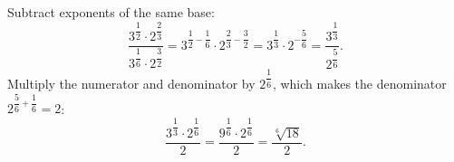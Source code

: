 Subtract exponents of the same base:
\[\dfrac{3^{\dfrac{1}{2}}\cdot2^{\dfrac{2}{3}}}{3^{\dfrac{1}{6}}\cdot2^{\dfrac{3}{2}}}=3^{\dfrac{1}{2}-\dfrac{1}{6}}\cdot2^{\dfrac{2}{3}-\dfrac{3}{2}}=3^{\dfrac{1}{3}}\cdot2^{-\dfrac{5}{6}}=\dfrac{3^{\dfrac{1}{3}}}{2^{\dfrac{5}{6}}}.\]
Multiply the numerator and denominator by $2^{\dfrac{1}{6}}$, which makes the denominator $2^{\dfrac{5}{6}+\dfrac{1}{6}}=2$:
\[\dfrac{3^{\dfrac{1}{3}}\cdot2^{\dfrac{1}{6}}}{2}=\dfrac{9^{\dfrac{1}{6}}\cdot2^{\dfrac{1}{6}}}{2}=\boxed{\dfrac{\sqrt[6]{18}}{2}}.\]
